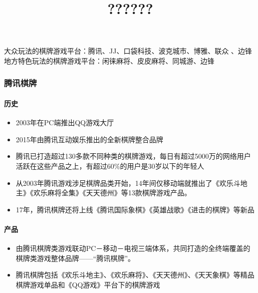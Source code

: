 \documentclass[11pt]{article}
\title{??????}
\providecommand{\tightlist}{%
      \setlength{\itemsep}{0pt}\setlength{\parskip}{0pt}}
\begin{document}
    
    
    \maketitle
    
    

    
    大众玩法的棋牌游戏平台：腾讯、JJ、口袋科技、波克城市、博雅、联众
、边锋\\
地方特色玩法的棋牌游戏平台：闲徕麻将、皮皮麻将、同城游、边锋

    \hypertarget{ux817eux8bafux68cbux724c}{%
\subsubsection{腾讯棋牌}\label{ux817eux8bafux68cbux724c}}

\hypertarget{ux5386ux53f2}{%
\paragraph{历史}\label{ux5386ux53f2}}

\begin{itemize}
\tightlist
\item
  2003年在PC端推出QQ游戏大厅
\item
  2015年由腾讯互动娱乐推出的全新棋牌整合品牌
\item
  腾讯已打造超过130多款不同种类的棋牌游戏，每日有超过5000万的网络用户活跃在这些产品之上，有超过60\%的用户是30岁以下的年轻人
\item
  从2003年腾讯游戏涉足棋牌品类开始，14年间仅移动端就推出了《欢乐斗地主》《欢乐麻将全集》《天天德州》等13款棋牌游戏产品。
\item
  17年，腾讯棋牌还将上线《腾讯国际象棋》《英雄战歌》《进击的棋牌》等新品
\end{itemize}

\hypertarget{ux4ea7ux54c1}{%
\paragraph{产品}\label{ux4ea7ux54c1}}

\begin{itemize}
\tightlist
\item
  由腾讯棋牌类游戏联动PC－移动－电视三端体系，共同打造的全终端覆盖的棋牌类游戏整体品牌------``腾讯棋牌''。
\item
  腾讯棋牌包括《欢乐斗地主》、《欢乐麻将》、《天天德州》、《天天象棋》等精品棋牌游戏单品和《QQ游戏》平台下的棋牌游戏
\end{itemize}
\end{document}
